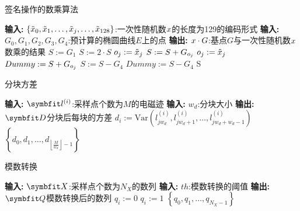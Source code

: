 {	\begin{breakablealgorithm}
		\caption{签名操作的数乘算法}\label{alg:signscalar}
		\begin{algorithmic}[1]
			\Statex \textbf{输入:} $\left\{\tilde{x}_0,\tilde{x}_1,\dots,\tilde{x}_j,\dots, \tilde{x}_{128}\right\}$:一次性随机数$x$的长度为129的编码形式
			\Statex \textbf{输入:} $G_0,G_1,G_2,G_3,G_4$:预计算的椭圆曲线$E$上的点
			\Statex \textbf{输出:} $x\cdot G$:基点$G$与一次性随机数$x$数乘的结果
			\State $S:=G_1$
			\State $S:=2\cdot S$
			\State $o_j:=\tilde {x}_j$
			\State $S:=S+G_{o_j}$
			\Else
			\State $o_j:=\tilde {x}_j$
			\State $Dummy:=S+G_{o_j}$
			\EndIf
			\EndFor
			\State $S:=S-G_4$
			\Else
			\State $Dummy:=S-G_4$
			\EndIf
			\State \Return S
		\end{algorithmic}
	\end{breakablealgorithm}

	\begin{breakablealgorithm}
		\caption{分块方差}\label{alg:calcvar}
		\begin{algorithmic}[1]
			\Statex \textbf{输入:} $\Vector{l}^{(i)}$:采样点个数为$M$的电磁迹
			\Statex \textbf{输入:} $w_d$:分块大小
			\Statex \textbf{输出:} $\Vector D$分块后每块的方差
			\For {$j:=0\dots\left\lfloor\frac{M}{w_d}\right\rfloor-1$}
			\State $d_i:=\mathrm{Var}(l^{(i)}_{jw_d},l^{(i)}_{jw_d+1},\dots,l^{(i)}_{jw_d+w_d-1})$
			\EndFor
			\State \Return $\left\{d_0,d_1,\dots,d_{\left\lfloor\frac{M}{w_d}\right\rfloor-1}\right\}$
		\end{algorithmic}
	\end{breakablealgorithm}
	
	\begin{breakablealgorithm}
		\caption{模数转换}\label{alg:quantize}
		\begin{algorithmic}[1]
			\Statex \textbf{输入:} $\Vector X$:采样点个数为$N_X$的数列
			\Statex \textbf{输入:} $th$:模数转换的阈值
			\Statex \textbf{输出:} $\Vector Q$模数转换后的数列
			\For {$i:=0\dots N_X-1$}
			\If{$x_i<th$}
			\State $q_i:=0$
			\Else
			\State $q_i:=1$
			\EndIf
			\EndFor
			\State \Return $\left\{q_0,q_1,\dots,q_{N_X-1}\right\}$
		\end{algorithmic}
	\end{breakablealgorithm}

}
